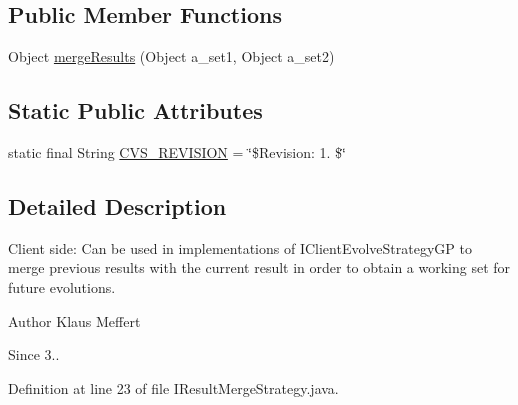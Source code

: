 \subsection*{Public Member Functions}
\begin{DoxyCompactItemize}
\item 
Object \hyperlink{interfaceorg_1_1jgap_1_1distr_1_1grid_1_1_i_result_merge_strategy_a8d66feed978d7c26bcc358cac663044f}{merge\-Results} (Object a\-\_\-set1, Object a\-\_\-set2)
\end{DoxyCompactItemize}
\subsection*{Static Public Attributes}
\begin{DoxyCompactItemize}
\item 
static final String \hyperlink{interfaceorg_1_1jgap_1_1distr_1_1grid_1_1_i_result_merge_strategy_aaadab088ddc9a214a37362048d772075}{C\-V\-S\-\_\-\-R\-E\-V\-I\-S\-I\-O\-N} = \char`\"{}\$Revision\-: 1. \$\char`\"{}
\end{DoxyCompactItemize}


\subsection{Detailed Description}
Client side\-: Can be used in implementations of I\-Client\-Evolve\-Strategy\-G\-P to merge previous results with the current result in order to obtain a working set for future evolutions.

\begin{DoxyAuthor}{Author}
Klaus Meffert 
\end{DoxyAuthor}
\begin{DoxySince}{Since}
3.. 
\end{DoxySince}


Definition at line 23 of file I\-Result\-Merge\-Strategy.\-java.



